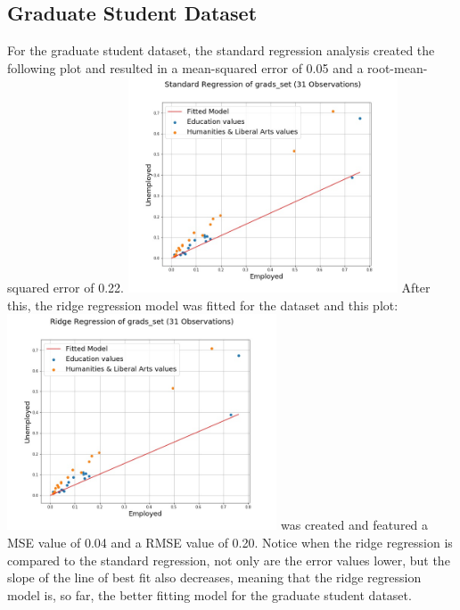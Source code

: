 \documentclass[a4paper,12pt]{IEEEtran}
\begin{document}
\subsection{Graduate Student Dataset}
\label{grad}
For the graduate student dataset, the standard regression analysis created the following plot and resulted in a mean-squared error of 0.05 and a root-mean-squared error of 0.22. \includegraphics[width=8cm]{std_reg_1d_grads_set} After this, the ridge regression model was fitted for the dataset and this plot: \includegraphics[width=8cm]{ridge_reg_1d_grads_set} was created and featured a MSE value of 0.04 and a RMSE value of 0.20. Notice when the ridge regression is compared to the standard regression, not only are the error values lower, but the slope of the line of best fit also decreases, meaning that the ridge regression model is, so far, the better fitting model for the graduate student dataset.
\end{document}
